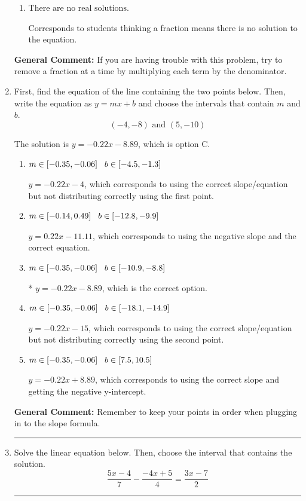 \documentclass{extbook}[14pt]
\newcommand{\litem}[1]{\item #1

\rule{\textwidth}{0.4pt}}
\begin{document}
\begin{enumerate}
{\begin{enumerate}[label=\Alph*.]
 $x = -35.000$, which corresponds to dividing the coefficients in front of x by the denominator rather than dividing BOTH parts of the numerator by the denominator (or removing the fractions through multiplication).
\item \( \text{There are no real solutions.} \)

Corresponds to students thinking a fraction means there is no solution to the equation.
\end{enumerate}

\textbf{General Comment:} If you are having trouble with this problem, try to remove a fraction at a time by multiplying each term by the denominator.
}
\litem{
First, find the equation of the line containing the two points below. Then, write the equation as $ y=mx+b $ and choose the intervals that contain $m$ and $b$.
\[ (-4, -8) \text{ and } (5, -10) \]

The solution is \( y = -0.22x -8.89 \), which is option C.\begin{enumerate}[label=\Alph*.]
\item \( m \in [-0.35, -0.06] \hspace*{3mm} b \in [-4.5, -1.3] \)

 $y = -0.22x -4$, which corresponds to using the correct slope/equation but not distributing correctly using the first point.
\item \( m \in [-0.14, 0.49] \hspace*{3mm} b \in [-12.8, -9.9] \)

 $y = 0.22x -11.11$, which corresponds to using the negative slope and the correct equation.
\item \( m \in [-0.35, -0.06] \hspace*{3mm} b \in [-10.9, -8.8] \)

* $y = -0.22x -8.89$, which is the correct option.
\item \( m \in [-0.35, -0.06] \hspace*{3mm} b \in [-18.1, -14.9] \)

 $y = -0.22x -15$, which corresponds to using the correct slope/equation but not distributing correctly using the second point.
\item \( m \in [-0.35, -0.06] \hspace*{3mm} b \in [7.5, 10.5] \)

 $y = -0.22x + 8.89$, which corresponds to using the correct slope and getting the negative y-intercept.
\end{enumerate}

\textbf{General Comment:} Remember to keep your points in order when plugging in to the slope formula.
}
\litem{
Solve the linear equation below. Then, choose the interval that contains the solution.
\[ \frac{5x -4}{7} - \frac{-4x + 5}{4} = \frac{3x -7}{2} \]

}
\end{enumerate}
\end{document}
